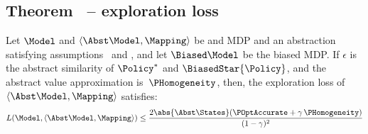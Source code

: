 \subsection{Theorem~ -- exploration loss}

\begin{theoremmain}{}
	Let $\Model$ and $\langle \Abst\Model, \Mapping \rangle$ be and MDP and an abstraction satisfying assumptions~ and ,
	and let $\Biased\Model$ be the biased MDP.
	If $\epsilon$ is the abstract similarity of $\Policy^*$ and $\BiasedStar{\Policy}$, and the abstract value approximation is~$\PHomogeneity$, then, the exploration loss of $\langle \Abst\Model, \Mapping \rangle$ satisfies:
	\begin{equation}
		L(\Model, \langle \Abst\Model, \Mapping \rangle) \le
			\frac{2 \abs{\Abst\States} (\POptAccurate + \gamma\, \PHomogeneity)}{(1-\gamma)^2}
	\end{equation}
\end{theoremmain}
